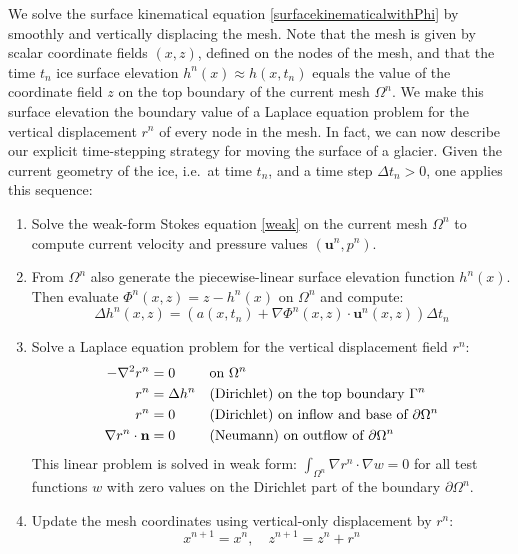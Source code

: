 \documentclass[letterpaper,final,12pt,reqno]{amsart}
\newcommand{\grad}{\nabla}
\newcommand{\bn}{\mathbf{n}}
\newcommand{\bu}{\mathbf{u}}
\begin{document}
We solve the surface kinematical equation \eqref{surfacekinematicalwithPhi} by smoothly and vertically displacing the mesh.  Note that the mesh is given by scalar coordinate fields $(x,z)$, defined on the nodes of the mesh, and that the time $t_n$ ice surface elevation $h^n(x) \approx h(x,t_n)$ equals the value of the coordinate field $z$ on the top boundary of the current mesh $\Omega^n$.  We make this surface elevation the boundary value of a Laplace equation problem for the vertical displacement $r^n$ of every node in the mesh.  In fact, we can now describe our explicit time-stepping strategy for moving the surface of a glacier.  Given the current geometry of the ice, i.e.~at time $t_n$, and a time step $\Delta t_n > 0$, one applies this sequence:

\medskip
\renewcommand{\labelenumi}{\emph{\arabic{enumi}.}}
\begin{enumerate}
\item Solve the weak-form Stokes equation \eqref{weak} on the current mesh $\Omega^n$ to compute current velocity and pressure values $(\bu^n,p^n)$.
\item From $\Omega^n$ also generate the piecewise-linear surface elevation function $h^n(x)$.  Then evaluate $\Phi^n(x,z) = z - h^n(x)$ on $\Omega^n$ and compute:
\begin{equation}
\Delta h^n(x,z) =  \left(a(x,t_n) + \grad \Phi^n(x,z)\cdot \bu^n(x,z)\right)\Delta t_n \label{deltahfield}
\end{equation}
\item Solve a Laplace equation problem for the vertical displacement field $r^n$:
\begin{align}
- \grad^2 r^n &= 0 & &\text{on } \Omega^n \label{vdisplacementpoisson} \\
          r^n &= \Delta h^n & &\text{(Dirichlet) on the top boundary } \Gamma^n \notag \\
          r^n &= 0 & &\text{(Dirichlet) on inflow and base of } \partial \Omega^n \notag \\
\grad r^n\cdot \bn &= 0 & &\text{(Neumann) on outflow of } \partial \Omega^n \notag
\end{align}
This linear problem is solved in weak form: $\int_{\Omega^n} \grad r^n\cdot \grad w = 0$ for all test functions $w$ with zero values on the Dirichlet part of the boundary $\partial \Omega^n$.
\item Update the mesh coordinates using vertical-only displacement by $r^n$:
\begin{equation}
  x^{n+1} = x^n, \quad z^{n+1} = z^n + r^n \label{updatemesh}
\end{equation}
\end{enumerate}
\end{document}
